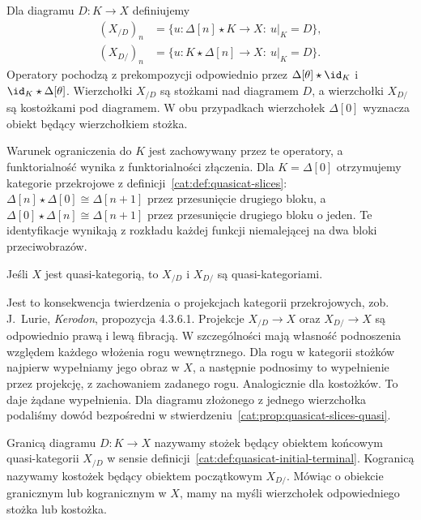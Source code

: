 \begin{definicja}\label{cat:def:quasicat-cones}
Dla diagramu $D:K\to X$ definiujemy
\[
\begin{aligned}
 (X_{/D})_n&=\{u:\Delta[n]\star K\to X:\ u|_K=D\},\\
 (X_{D/})_n&=\{u:K\star\Delta[n]\to X:\ u|_K=D\}.
\end{aligned}
\]
Operatory pochodzą z prekompozycji odpowiednio przez $\Delta[\theta]\star\id_K$ i $\id_K\star\Delta[\theta]$. Wierzchołki $X_{/D}$ są stożkami nad diagramem $D$, a wierzchołki $X_{D/}$ są kostożkami pod diagramem. W obu przypadkach wierzchołek $\Delta[0]$ wyznacza obiekt będący wierzchołkiem stożka.
\end{definicja}
Warunek ograniczenia do $K$ jest zachowywany przez te operatory, a funktorialność wynika z funktorialności złączenia. Dla $K=\Delta[0]$ otrzymujemy kategorie przekrojowe z definicji~\ref{cat:def:quasicat-slices}: $\Delta[n]\star\Delta[0]\cong\Delta[n+1]$ przez przesunięcie drugiego bloku, a $\Delta[0]\star\Delta[n]\cong\Delta[n+1]$ przez przesunięcie drugiego bloku o jeden. Te identyfikacje wynikają z rozkładu każdej funkcji niemalejącej na dwa bloki przeciwobrazów.

\begin{twierdzenie}\label{cat:thm:quasicat-cones}
Jeśli $X$ jest quasi-kategorią, to $X_{/D}$ i $X_{D/}$ są quasi-kategoriami.
\end{twierdzenie}
Jest to konsekwencja twierdzenia o projekcjach kategorii przekrojowych, zob. J.~Lurie, \emph{Kerodon}, propozycja 4.3.6.1. Projekcje $X_{/D}\to X$ oraz $X_{D/}\to X$ są odpowiednio prawą i lewą fibracją. W szczególności mają własność podnoszenia względem każdego włożenia rogu wewnętrznego. Dla rogu w kategorii stożków najpierw wypełniamy jego obraz w $X$, a następnie podnosimy to wypełnienie przez projekcję, z zachowaniem zadanego rogu. Analogicznie dla kostożków. To daje żądane wypełnienia. Dla diagramu złożonego z jednego wierzchołka podaliśmy dowód bezpośredni w stwierdzeniu~\ref{cat:prop:quasicat-slices-quasi}.

\begin{definicja}\label{cat:def:quasicat-limits}
Granicą diagramu $D:K\to X$ nazywamy stożek będący obiektem końcowym quasi-kategorii $X_{/D}$ w sensie definicji~\ref{cat:def:quasicat-initial-terminal}. Kogranicą nazywamy kostożek będący obiektem początkowym $X_{D/}$. Mówiąc o obiekcie granicznym lub kogranicznym w $X$, mamy na myśli wierzchołek odpowiedniego stożka lub kostożka.
\end{definicja}

